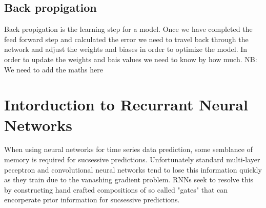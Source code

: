 \documentclass{article}
\begin{document}
\subsection{Back propigation}
\label{sec:back}
Back propigation is the learning step for a model. Once we have completed the feed forward step and calculated the error we need to travel back through the network and adjust the weights and biases in order to optimize the model. In order to update the weights and bais values we need to know by how much.  
NB: We need to add the maths here 

\section{Intorduction to Recurrant Neural Networks}
\label{sec:intoRNNs}
When using neural networks for time series data prediction, some semblance of memory is required for sucsessive predictions. Unfortunately standard multi-layer peceptron and convolutional neural networks tend to lose this information quickly as they train due to the vanashing gradient problem. RNNs seek to resolve this by constructing hand crafted compositions of so called "gates" that can encorperate prior information for sucsessive predictions. 
\end{document}

